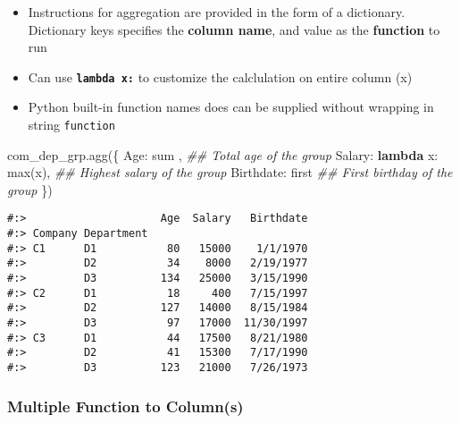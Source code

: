 \documentclass[
]{book}
\newenvironment{Shaded}{\begin{snugshade}}{\end{snugshade}}
\newcommand{\BuiltInTok}[1]{#1}
\newcommand{\CommentTok}[1]{\textcolor[rgb]{0.37,0.37,0.37}{\textit{#1}}}
\newcommand{\KeywordTok}[1]{\textcolor[rgb]{0.27,0.27,0.27}{\textbf{#1}}}
\newcommand{\NormalTok}[1]{#1}
\newcommand{\StringTok}[1]{\textcolor[rgb]{0.5,0.5,0.5}{#1}}
\providecommand{\tightlist}{%
  \setlength{\itemsep}{0pt}\setlength{\parskip}{0pt}}
\begin{document}
\begin{itemize}
\tightlist
\item
  Instructions for aggregation are provided in the form of a dictionary. Dictionary keys specifies the \textbf{column name}, and value as the \textbf{function} to run\\
\item
  Can use \textbf{\texttt{lambda\ x:}} to customize the calclulation on entire column (x)\\
\item
  Python built-in function names does can be supplied without wrapping in string \texttt{\textquotesingle{}function\textquotesingle{}}
\end{itemize}

\begin{Shaded}
\begin{Highlighting}[]
\NormalTok{com\_dep\_grp.agg(\{}
  \StringTok{\textquotesingle{}Age\textquotesingle{}}\NormalTok{: }\BuiltInTok{sum}\NormalTok{ ,                 }\CommentTok{\#\# Total age of the group}
  \StringTok{\textquotesingle{}Salary\textquotesingle{}}\NormalTok{: }\KeywordTok{lambda}\NormalTok{ x: }\BuiltInTok{max}\NormalTok{(x),  }\CommentTok{\#\# Highest salary of the group}
  \StringTok{\textquotesingle{}Birthdate\textquotesingle{}}\NormalTok{: }\StringTok{\textquotesingle{}first\textquotesingle{}}         \CommentTok{\#\# First birthday of the group}
\NormalTok{\})}
\end{Highlighting}
\end{Shaded}

\begin{verbatim}
#:>                     Age  Salary   Birthdate
#:> Company Department                         
#:> C1      D1           80   15000    1/1/1970
#:>         D2           34    8000   2/19/1977
#:>         D3          134   25000   3/15/1990
#:> C2      D1           18     400   7/15/1997
#:>         D2          127   14000   8/15/1984
#:>         D3           97   17000  11/30/1997
#:> C3      D1           44   17500   8/21/1980
#:>         D2           41   15300   7/17/1990
#:>         D3          123   21000   7/26/1973
\end{verbatim}

\hypertarget{multiple-function-to-columns}{%
\subsubsection{Multiple Function to Column(s)}\label{multiple-function-to-columns}}
\end{document}
